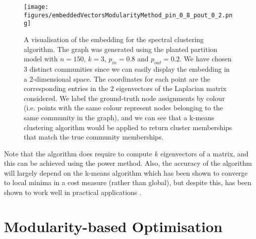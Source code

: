 \begin{figure}
	\centering
	\texttt{[image: figures/embeddedVectorsModularityMethod\_pin\_0\_8\_pout\_0\_2.png]}
	\caption[Visualisation of spectral clustering embedding.]{\label{fig:SpectralClusteringEmbeddingVisualisation} A visualisation of the embedding for the spectral clustering algorithm. The graph was generated using the planted partition model with $n=150$, $k=3$, $p_{in}=0.8$ and $p_{out}=0.2$. We have chosen $3$ distinct communities since we can easily display the embedding in a 2-dimensional space. The coordinates for each point are the corresponding entries in the 2 eigenvectors of the Laplacian matrix considered. We label the ground-truth node assignments by colour (i.e. points with the same colour represent nodes belonging to the same community in the graph), and we can see that a k-means clustering algorithm would be applied to return cluster memberships that match the true community memberships.}
\end{figure}

Note that the algorithm does require to compute $k$ eigenvectors of a matrix, and this can be achieved using the power method.
Also, the accuracy of the algorithm will largely depend on the k-means algorithm which has been shown to converge to local minima in a cost measure (rather than global), but despite this, has been shown to work well in practical applications \cite{Lux06,For10}.


\section{Modularity-based Optimisation}
\label{sec:modularityBasedOptimisation}
 
